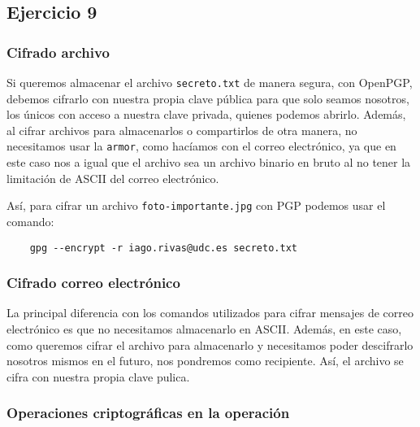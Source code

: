 \subsection{Ejercicio 9}
\graphicspath{ {img/09} }

\subsubsection{Cifrado archivo}

Si queremos almacenar el archivo \texttt{secreto.txt} de manera segura, con OpenPGP, debemos cifrarlo con nuestra propia clave pública para que solo seamos nosotros, los únicos con acceso a nuestra clave privada, quienes podemos abrirlo. Además, al cifrar archivos para almacenarlos o compartirlos de otra manera, no necesitamos usar la \texttt{armor}, como hacíamos con el correo electrónico, ya que en este caso nos a igual que el archivo sea un archivo binario en bruto al no tener la limitación de ASCII del correo electrónico.

Así, para cifrar un archivo \texttt{foto-importante.jpg} con PGP podemos usar el comando:

\begin{verbatim}
    gpg --encrypt -r iago.rivas@udc.es secreto.txt
\end{verbatim}

\subsubsection{Cifrado correo electrónico}

La principal diferencia con los comandos utilizados para cifrar mensajes de correo electrónico es que no necesitamos almacenarlo en ASCII. Además, en este caso, como queremos cifrar el archivo para almacenarlo y necesitamos poder descifrarlo nosotros mismos en el futuro, nos pondremos como recipiente. Así, el archivo se cifra con nuestra propia clave pulica.

\subsubsection{Operaciones criptográficas en la operación}

